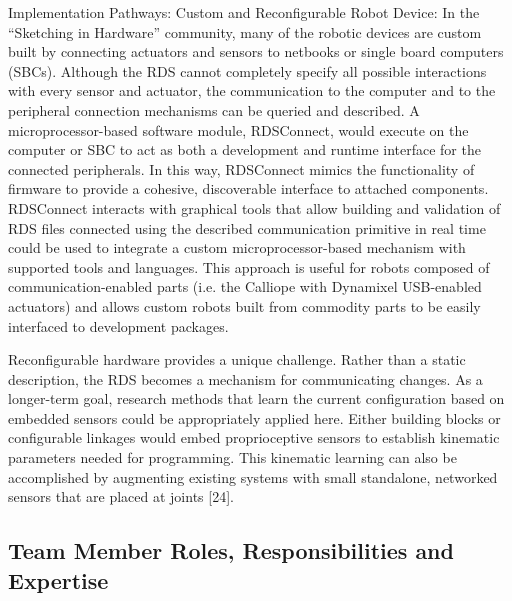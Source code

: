 Implementation Pathways: Custom and Reconfigurable Robot Device: In the “Sketching in Hardware” community, many of the robotic devices are custom built by connecting actuators and sensors to netbooks or single board computers (SBCs).  Although the RDS cannot completely specify all possible interactions with every sensor and actuator, the communication to the computer and to the peripheral connection mechanisms can be queried and described.  A microprocessor-based software module, RDSConnect, would execute on the computer or SBC to act as both a development and runtime interface for the connected peripherals. In this way, RDSConnect mimics the functionality of firmware to provide a cohesive, discoverable interface to attached components.  RDSConnect interacts with graphical tools that allow building and validation of RDS files connected using the described communication primitive in real time could be used to integrate a custom microprocessor-based mechanism with supported tools and languages.  This approach is useful for robots composed of communication-enabled parts (i.e. the Calliope with Dynamixel USB-enabled actuators) and allows custom robots built from commodity parts to be easily interfaced to development packages.

Reconfigurable hardware provides a unique challenge.  Rather than a static description, the RDS becomes a mechanism for communicating changes.  As a longer-term goal, research methods that learn the current configuration based on embedded sensors could be appropriately applied here. Either building blocks or configurable linkages would embed proprioceptive sensors to establish kinematic parameters needed for programming.  This kinematic learning can also be accomplished by augmenting existing systems with small standalone, networked sensors that are placed at joints [24]. 

\subsection{Team Member Roles, Responsibilities and Expertise}


